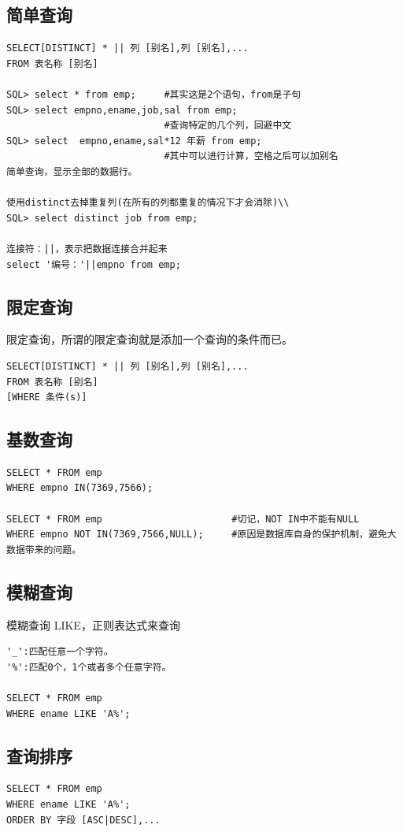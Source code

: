 \subsection{简单查询}
\begin{verbatim}
SELECT[DISTINCT] * || 列 [别名],列 [别名],...
FROM 表名称 [别名]

SQL> select * from emp;     #其实这是2个语句，from是子句
SQL> select empno,ename,job,sal from emp;
                            #查询特定的几个列，回避中文
SQL> select  empno,ename,sal*12 年薪 from emp;
                            #其中可以进行计算，空格之后可以加别名
简单查询，显示全部的数据行。

使用distinct去掉重复列(在所有的列都重复的情况下才会消除)\\
SQL> select distinct job from emp;

连接符：||，表示把数据连接合并起来
select '编号：'||empno from emp;
\end{verbatim}

\subsection{限定查询}
限定查询，所谓的限定查询就是添加一个查询的条件而已。
\begin{verbatim}
SELECT[DISTINCT] * || 列 [别名],列 [别名],...
FROM 表名称 [别名]
[WHERE 条件(s)]
\end{verbatim}

\subsection{基数查询}
\begin{verbatim}
SELECT * FROM emp
WHERE empno IN(7369,7566);

SELECT * FROM emp                       #切记，NOT IN中不能有NULL
WHERE empno NOT IN(7369,7566,NULL);     #原因是数据库自身的保护机制，避免大数据带来的问题。
\end{verbatim}

\subsection{模糊查询}
模糊查询 LIKE，正则表达式来查询
\begin{verbatim}
'_':匹配任意一个字符。
'%':匹配0个，1个或者多个任意字符。

SELECT * FROM emp
WHERE ename LIKE 'A%';
\end{verbatim}

\subsection{查询排序}
\begin{verbatim}
SELECT * FROM emp
WHERE ename LIKE 'A%';
ORDER BY 字段 [ASC|DESC],...
\end{verbatim}

